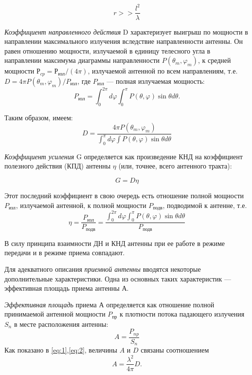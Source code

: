 \begin{equation}
    r>>\frac{l^2}{\lambda}
    \label{eq:1}
\end{equation}

\textit{Коэффициент направленного действия} D характеризует
выигрыш по  мощности в направлении максимального излучения вследствие направленности антенны. Он равен отношению 
мощности, излучаемой в единицу телесного угла в направлении максимума диаграммы направленности $P(\theta_m,\varphi_m)$, к средней 
мощности $Р_{cp} = Р_{\text{изл}} /(4\pi)$, излучаемой антенной по всем направлениям, т.е. $ D=4 \pi
P\left(\theta_{m}, \varphi_{m}\right) / P_{\text{изл}} $, где $P_{\text{изл}} $ — полная излучаемая мощность:
$$  P_{\text{изл}} = \int_0^{2\pi}d\varphi \int_0^\pi P( \theta,\varphi ) \sin{\theta}d \theta. $$

Таким образом, имеем:
\begin{equation}
    D=\frac{4 \pi P\left(\theta_{m}, \varphi_{m}\right)}{\int_{0}^{\pi} d \varphi \int P(\theta, \varphi) \sin \theta d \theta}
    \label{eq:2}    
\end{equation}

\textit{Коэффициент усиления} G определяется как произведение КНД на коэффициент полезного действия (КПД) антенны $\eta$
(или, точнее, всего антенного тракта):

\begin{equation}
    G = D\eta
    \label{eq:3}    
\end{equation}

Этот последний коэффициент в свою очередь есть отношение полной мощности $P_{\text{изл}}$, излучаемой антенной, к полной
мощности $P_{\text{подв}}$, подводимой к антенне, т.е.
\begin{equation}
    \eta =\frac{P_{\text{изл}}}{P_{\text{подв}}} = \frac{\int_{0}^{2 \pi} d \varphi \int_{0}^{\pi} P(\theta, \varphi) \sin \theta d \theta}{P_{\text{подв}}}
    \label{eq:4}    
\end{equation}

В силу принципа взаимности ДН и КНД антенны при ее работе в режиме передачи и в режиме приема совпадают.


Для адекватного описания \textit{приемной антенны} вводятся некоторые дополнительные характеристики. Одна из основных таких характеристик — эффективная площадь приема антенны $А$.


\textit{Эффективная площадь} приема $А$ определяется как отношение полной принимаемой антенной мощности $P_{\text{пр}}$ к плотности потока падающего
излучения $S_n$ в месте расположения антенны:
\begin{equation}
    A = \frac{P_{np}}{S_n}
    \label{eq:5}
\end{equation}
Как показано в \ref{eq:1},\ref{eq:2}, величины $A$ и $D$ связаны соотношением
\begin{equation}
    A = \frac{\lambda^2}{4\pi}D.
    \label{eq:6}
\end{equation}

